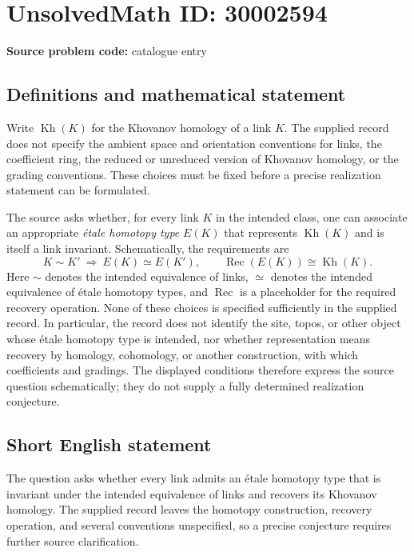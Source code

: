 \documentclass[11pt]{article}
\begin{document}
\section*{UnsolvedMath ID: 30002594}
\textbf{Source problem code:} catalogue entry
\subsection{Definitions and mathematical statement}
Write \(\operatorname{Kh}(K)\) for the Khovanov homology of a link \(K\). The supplied record does not specify the ambient space and orientation conventions for links, the coefficient ring, the reduced or unreduced version of Khovanov homology, or the grading conventions. These choices must be fixed before a precise realization statement can be formulated.

The source asks whether, for every link \(K\) in the intended class, one can associate an appropriate \emph{\'{e}tale homotopy type} \(E(K)\) that represents \(\operatorname{Kh}(K)\) and is itself a link invariant. Schematically, the requirements are
\[
K\sim K'\ \Longrightarrow\ E(K)\simeq E(K'),
\qquad
\operatorname{Rec}(E(K))\cong\operatorname{Kh}(K).
\]
Here \(\sim\) denotes the intended equivalence of links, \(\simeq\) denotes the intended equivalence of \'{e}tale homotopy types, and \(\operatorname{Rec}\) is a placeholder for the required recovery operation. None of these choices is specified sufficiently in the supplied record. In particular, the record does not identify the site, topos, or other object whose \'{e}tale homotopy type is intended, nor whether representation means recovery by homology, cohomology, or another construction, with which coefficients and gradings. The displayed conditions therefore express the source question schematically; they do not supply a fully determined realization conjecture.
\subsection{Short English statement}
The question asks whether every link admits an \'{e}tale homotopy type that is invariant under the intended equivalence of links and recovers its Khovanov homology. The supplied record leaves the homotopy construction, recovery operation, and several conventions unspecified, so a precise conjecture requires further source clarification.
\end{document}
